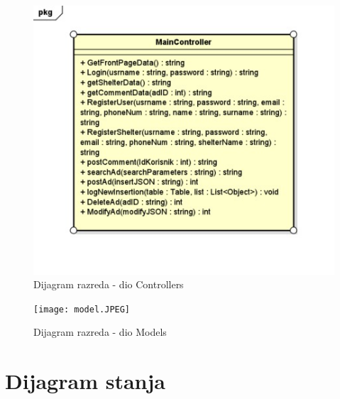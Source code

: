 			\begin{figure}[H]
				
				\includegraphics[scale =0.4]{kontroler.JPEG}
				\centering
				\caption{Dijagram razreda - dio Controllers}
				\label{fig:dijagramrazredakontroler}
			\end{figure}
			
			\begin{figure}[H]
				
				\texttt{[image: model.JPEG]}
				\centering
				\caption{Dijagram razreda - dio Models}
				\label{fig:dijagramrazredamodels}
			\end{figure}
		
		\section{Dijagram stanja}
			
			
			
			
